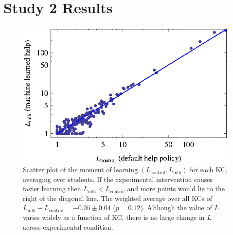 \documentclass{edm_template}
\begin{document}
\section{Study 2 Results}
%
%

\begin{figure}
   \centering\includegraphics{scatter-step}
   \caption{Scatter plot of the moment of learning 
      $(L_\mathrm{control},L_\mathrm{mlh})$ for each
     KC, averaging over students.  If the experimental intervention causes
     faster learning then $L_\mathrm{mlh}<L_\mathrm{control}$ and more points would lie to the 
    right of the diagonal line.
     The weighted average over all KCs of $L_\mathrm{mlh}-L_\mathrm{control} = -0.05\pm 0.04$ ($p=0.12$).
     Although the value of $L$ varies widely as a function of KC, there
     is no large change in $L$ across experimental condition.
   }
   \label{scatterstep}
\end{figure}
\end{document}
